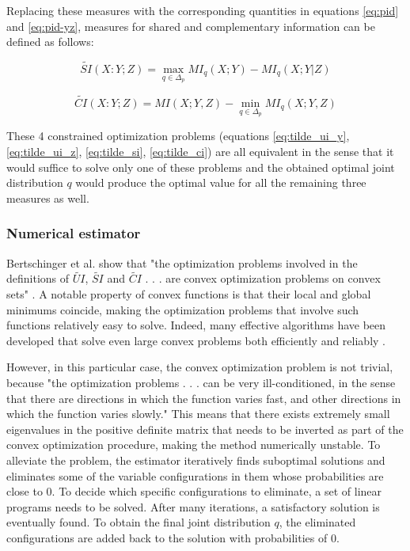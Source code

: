 \documentclass[12pt]{article}
\begin{document}
Replacing these measures with the corresponding quantities in equations \ref{eq:pid} and \ref{eq:pid-yz}, measures for shared and complementary information can be defined as follows: 

\begin{equation}
\widetilde{SI}(X:Y;Z) = \max_{q \in \Delta_p} MI_q (X;Y) - MI_q(X;Y|Z)
\label{eq:tilde_si}
\end{equation}

\begin{equation}
\widetilde{CI}(X:Y;Z) = MI(X;Y,Z) - \min_{q \in \Delta_p} MI_q(X;Y,Z)
\label{eq:tilde_ci}
\end{equation}

These 4 constrained optimization problems (equations \ref{eq:tilde_ui_y}, \ref{eq:tilde_ui_z}, \ref{eq:tilde_si}, \ref{eq:tilde_ci}) are all equivalent in the sense that it would suffice to solve only one of these problems and the obtained optimal joint distribution $q$ would produce the optimal value for all the remaining three measures as well. 

\subsubsection{Numerical estimator}

Bertschinger et al. show that "the optimization problems involved in the definitions of $\widetilde{UI}$, $\widetilde{SI}$ and $\widetilde{CI}$ . . . are convex optimization problems on convex sets" \cite{bertschinger}. A notable property of convex functions is that their local and global minimums coincide, making the optimization problems that involve such functions relatively easy to solve. Indeed, many effective algorithms have been developed that solve even large convex problems both efficiently and reliably \cite{boyd}. 

However, in this particular case, the convex optimization problem is not trivial, because "the optimization problems . . . can be very ill-conditioned, in the sense that there are directions in which the function varies fast, and other directions in which the function varies slowly." \cite{bertschinger} This means that there exists extremely small eigenvalues in the positive definite matrix that needs to be inverted as part of the convex optimization procedure, making the method numerically unstable. To alleviate the problem, the estimator iteratively finds suboptimal solutions and eliminates some of the variable configurations in them whose probabilities are close to 0. To decide which specific configurations to eliminate, a set of linear programs needs to be solved. After many iterations, a satisfactory solution is eventually found. To obtain the final joint distribution $q$, the eliminated configurations are added back to the solution with probabilities of 0. 
\end{document}
